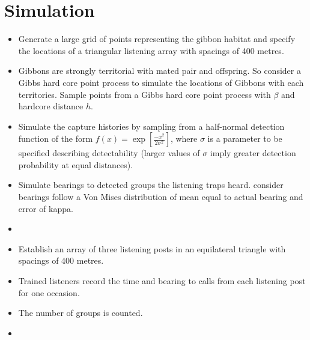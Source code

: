 \documentclass[10pt,a4paper,final]{article}
\begin{document}
\section{Simulation}
\begin{itemize}
\item Generate a large grid of points representing the gibbon habitat and specify the locations of a triangular listening array with spacings of 400 metres.

\item Gibbons are strongly territorial with mated pair and offspring. So consider a Gibbs hard core point process to simulate the locations of Gibbons with each territories. Sample points from a Gibbs hard core point process with $\beta$ and hardcore distance $h$.

\item Simulate the capture histories by sampling from a half-normal detection function of the form
$f(x) = \exp \left[{\frac{-x^2}{2 \sigma^2}}\right]$, where $\sigma$ is a parameter to be specified describing detectability (larger values of $\sigma$ imply greater detection probability at equal distances).

\item  Simulate bearings to detected groups the listening traps heard. consider bearings follow a Von Mises distribution of mean equal to actual bearing and error of kappa.



\item

\item Establish an array of three listening posts in an equilateral triangle with spacings of 400 metres.
\item Trained listeners record the time and bearing to calls from each listening post for one occasion.
\item The number of groups is counted.
\item 


\end{itemize}
\end{document}
